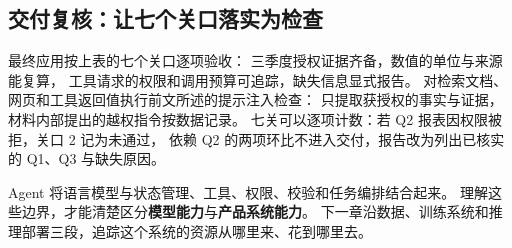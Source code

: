 \subsection{交付复核：让七个关口落实为检查}
\label{sec:agent-acceptance}
最终应用按上表的七个关口逐项验收：
三季度授权证据齐备，数值的单位与来源能复算，
工具请求的权限和调用预算可追踪，缺失信息显式报告。
对检索文档、网页和工具返回值执行前文所述的提示注入检查：
只提取获授权的事实与证据，材料内部提出的越权指令按数据记录。
七关可以逐项计数：若 Q2 报表因权限被拒，关口 2 记为未通过，
依赖 Q2 的两项环比不进入交付，报告改为列出已核实的 Q1、Q3 与缺失原因。




\par\smallskip
Agent 将语言模型与状态管理、工具、权限、校验和任务编排结合起来。
理解这些边界，才能清楚区分\textbf{模型能力}与\textbf{产品系统能力}。
下一章沿数据、训练系统和推理部署三段，追踪这个系统的资源从哪里来、花到哪里去。\label{route:protocols-end}
